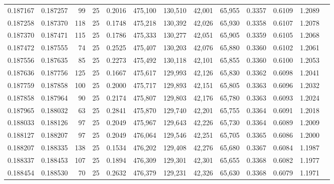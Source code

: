 \begin{tabular}{rrrrrrrrrrrrr}
0.187167 & 0.187257 &    99 &  25 &                                     0.2016 & 475,100 & 130,510 &  42,001 &  65,955 & 0.3357 & 0.6109 & 1.2089 \\
0.187258 & 0.187370 &   118 &  25 &                                     0.1748 & 475,218 & 130,392 &  42,026 &  65,930 & 0.3358 & 0.6107 & 1.2078 \\
0.187370 & 0.187471 &   115 &  25 &                                     0.1786 & 475,333 & 130,277 &  42,051 &  65,905 & 0.3359 & 0.6105 & 1.2068 \\
0.187472 & 0.187555 &    74 &  25 &                                     0.2525 & 475,407 & 130,203 &  42,076 &  65,880 & 0.3360 & 0.6102 & 1.2061 \\
0.187556 & 0.187635 &    85 &  25 &                                     0.2273 & 475,492 & 130,118 &  42,101 &  65,855 & 0.3360 & 0.6100 & 1.2053 \\
0.187636 & 0.187756 &   125 &  25 &                                     0.1667 & 475,617 & 129,993 &  42,126 &  65,830 & 0.3362 & 0.6098 & 1.2041 \\
0.187759 & 0.187858 &   100 &  25 &                                     0.2000 & 475,717 & 129,893 &  42,151 &  65,805 & 0.3363 & 0.6096 & 1.2032 \\
0.187858 & 0.187964 &    90 &  25 &                                     0.2174 & 475,807 & 129,803 &  42,176 &  65,780 & 0.3363 & 0.6093 & 1.2024 \\
0.187965 & 0.188032 &    63 &  25 &                                     0.2841 & 475,870 & 129,740 &  42,201 &  65,755 & 0.3364 & 0.6091 & 1.2018 \\
0.188033 & 0.188126 &    97 &  25 &                                     0.2049 & 475,967 & 129,643 &  42,226 &  65,730 & 0.3364 & 0.6089 & 1.2009 \\
0.188127 & 0.188207 &    97 &  25 &                                     0.2049 & 476,064 & 129,546 &  42,251 &  65,705 & 0.3365 & 0.6086 & 1.2000 \\
0.188207 & 0.188335 &   138 &  25 &                                     0.1534 & 476,202 & 129,408 &  42,276 &  65,680 & 0.3367 & 0.6084 & 1.1987 \\
0.188337 & 0.188453 &   107 &  25 &                                     0.1894 & 476,309 & 129,301 &  42,301 &  65,655 & 0.3368 & 0.6082 & 1.1977 \\
0.188454 & 0.188530 &    70 &  25 &                                     0.2632 & 476,379 & 129,231 &  42,326 &  65,630 & 0.3368 & 0.6079 & 1.1971 \\

\end{tabular}
